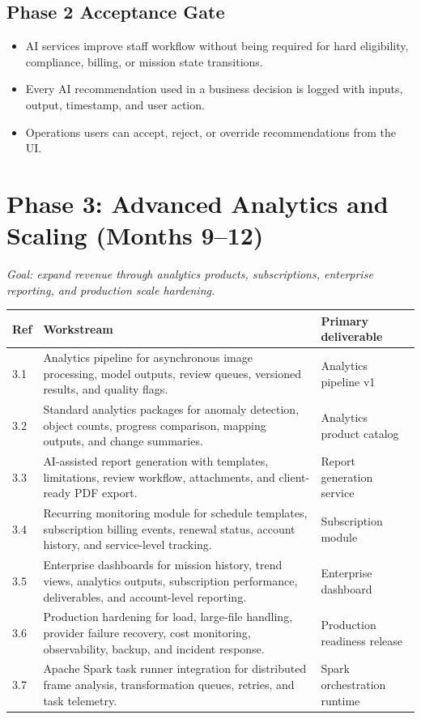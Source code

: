 \documentclass[11pt,a4paper]{article}
\begin{document}
\subsection*{Phase 2 Acceptance Gate}

\begin{itemize}[leftmargin=*]
    \item AI services improve staff workflow without being required for hard eligibility, compliance, billing, or mission state transitions.
    \item Every AI recommendation used in a business decision is logged with inputs, output, timestamp, and user action.
    \item Operations users can accept, reject, or override recommendations from the UI.
\end{itemize}

\section{Phase 3: Advanced Analytics and Scaling (Months 9--12)}

\textit{Goal: expand revenue through analytics products, subscriptions, enterprise reporting, and production scale hardening.}

\begin{longtable}{p{}p{}p{}}
\toprule
\textbf{Ref} & \textbf{Workstream} & \textbf{Primary deliverable} \\
\midrule
3.1 & Analytics pipeline for asynchronous image processing, model outputs, review queues, versioned results, and quality flags. & Analytics pipeline v1 \\
3.2 & Standard analytics packages for anomaly detection, object counts, progress comparison, mapping outputs, and change summaries. & Analytics product catalog \\
3.3 & AI-assisted report generation with templates, limitations, review workflow, attachments, and client-ready PDF export. & Report generation service \\
3.4 & Recurring monitoring module for schedule templates, subscription billing events, renewal status, account history, and service-level tracking. & Subscription module \\
3.5 & Enterprise dashboards for mission history, trend views, analytics outputs, subscription performance, deliverables, and account-level reporting. & Enterprise dashboard \\
3.6 & Production hardening for load, large-file handling, provider failure recovery, cost monitoring, observability, backup, and incident response. & Production readiness release \\
3.7 & Apache Spark task runner integration for distributed frame analysis, transformation queues, retries, and task telemetry. & Spark orchestration runtime \\
\bottomrule
\end{longtable}
\end{document}
